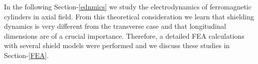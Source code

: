 \documentclass[12pt]{article}
\begin{document}
In  the following Section-\ref{ednmics} we study  the electrodynamics of  
ferromagnetic cylinders  in axial field. From this theoretical 
consideration  we learn that shielding dynamics  is very  different from 
the transverse case and that longitudinal dimensions are of a crucial importance. 
Therefore, a detailed FEA calculations with several 
shield  models were performed and we discuss these studies in Section-\ref{FEA}.



\end{document}
